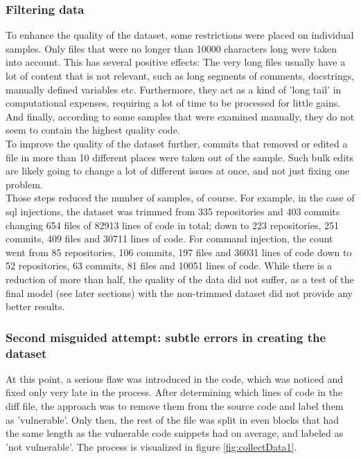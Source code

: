 \documentclass[
a4paper,
pagesize,
pdftex,
12pt,
ngerman,
fleqn,
final,
]{scrartcl}
\begin{document}
	\subsubsection{Filtering data}
	To enhance the quality of the dataset, some restrictions were placed on individual samples. Only files that were no longer than 10000 characters long were taken into account. This has several positive effects: The very long files usually have a lot of content that is not relevant, such as long segments of comments, docstrings, manually defined variables etc. Furthermore, they act as a kind of 'long tail' in computational expenses, requiring a lot of time to be processed for little gains. And finally, according to some samples that were examined manually, they do not seem to contain the highest quality code.\\
	To improve the quality of the dataset further, commits that removed or edited a file in more than 10 different places were taken out of the sample. Such bulk edits are likely going to change a lot of different issues at once, and not just fixing one problem.\\
	Those steps reduced the number of samples, of course. For example, in the case of sql injections, the dataset was trimmed from 335 repositories and 403 commits changing 654 files of 82913 lines of code in total; down to 223 repositories, 251 commits, 409 files and 30711 lines of code. For command injection, the count went from 85 repositories, 106 commits, 197 files and 36031 lines of code down to 52 repositories, 63 commits, 81 files and 10051 lines of code. While there is a reduction of more than half, the quality of the data did not suffer, as a test of the final model (see later sections) with the non-trimmed dataset did not provide any better results.
	
	\subsubsection{Second misguided attempt: subtle errors in creating the dataset}
	At this point, a serious flaw was introduced in the code, which was noticed and fixed only very late in the process. After determining which lines of code in the diff file, the approach was to remove them from the source code and label them as 'vulnerable'. Only then, the rest of the file was split in even blocks that had the same length as the vulnerable code snippets had on average, and labeled as 'not vulnerable'. The process is visualized in figure \ref{fig:collectData1}.
	
\end{document}

